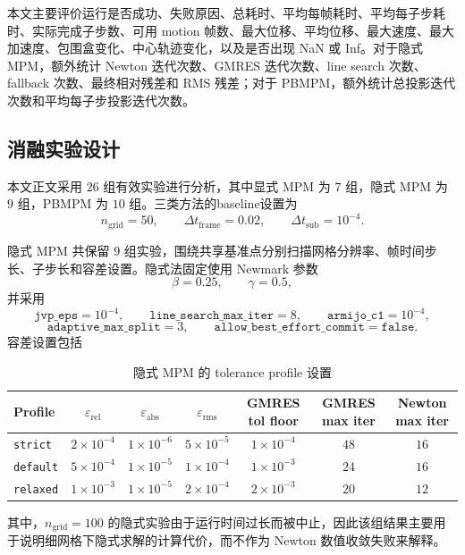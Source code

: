 \documentclass[a4paper]{article}
\begin{document}
本文主要评价运行是否成功、失败原因、总耗时、平均每帧耗时、平均每子步耗时、实际完成子步数、可用 motion 帧数、最大位移、平均位移、最大速度、最大加速度、包围盒变化、中心轨迹变化，以及是否出现 NaN 或 Inf。对于隐式 MPM，额外统计 Newton 迭代次数、GMRES 迭代次数、line search 次数、fallback 次数、最终相对残差和 RMS 残差；对于 PBMPM，额外统计总投影迭代次数和平均每子步投影迭代次数。

\subsection{消融实验设计}

本文正文采用 $26$ 组有效实验进行分析，其中显式 MPM 为 $7$ 组，隐式 MPM 为 $9$ 组，PBMPM 为 $10$ 组。三类方法的baseline设置为
\[
    n_{\mathrm{grid}}=50,\qquad
    \Delta t_{\mathrm{frame}}=0.02,\qquad
    \Delta t_{\mathrm{sub}}=10^{-4}.
\]

隐式 MPM 共保留 $9$ 组实验，围绕共享基准点分别扫描网格分辨率、帧时间步长、子步长和容差设置。隐式法固定使用 Newmark 参数
\[
    \beta=0.25,\qquad
    \gamma=0.5,
\]
并采用
\[
    \texttt{jvp\_eps}=10^{-4},\qquad
    \texttt{line\_search\_max\_iter}=8,\qquad
    \texttt{armijo\_c1}=10^{-4},
\]
\[
    \texttt{adaptive\_max\_split}=3,\qquad
    \texttt{allow\_best\_effort\_commit}=\texttt{false}.
\]
容差设置包括
\begin{table}[H]
\centering
\caption{隐式 MPM 的 tolerance profile 设置}
\label{tab:implicit-tolerance-profile}
\begin{tabular}{lcccccc}
\toprule
Profile &
$\varepsilon_{\mathrm{rel}}$ &
$\varepsilon_{\mathrm{abs}}$ &
$\varepsilon_{\mathrm{rms}}$ &
GMRES tol floor &
GMRES max iter &
Newton max iter \\
\midrule
\texttt{strict} &
$2\times 10^{-4}$ &
$1\times 10^{-6}$ &
$5\times 10^{-5}$ &
$1\times 10^{-4}$ &
$48$ &
$16$ \\

\texttt{default} &
$5\times 10^{-4}$ &
$1\times 10^{-5}$ &
$1\times 10^{-4}$ &
$1\times 10^{-3}$ &
$24$ &
$16$ \\

\texttt{relaxed} &
$1\times 10^{-3}$ &
$1\times 10^{-5}$ &
$2\times 10^{-4}$ &
$2\times 10^{-3}$ &
$20$ &
$12$ \\
\bottomrule
\end{tabular}
\end{table}
其中，$n_{\mathrm{grid}}=100$ 的隐式实验由于运行时间过长而被中止，因此该组结果主要用于说明细网格下隐式求解的计算代价，而不作为 Newton 数值收敛失败来解释。
\end{document}
